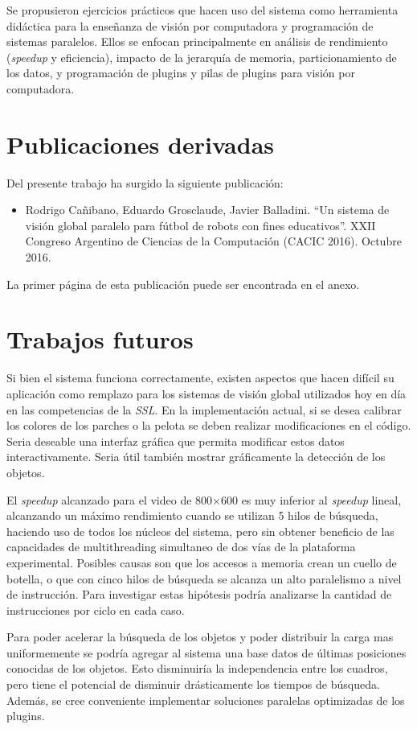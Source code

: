 Se propusieron ejercicios prácticos que hacen uso del sistema como herramienta
didáctica para la enseñanza de visión por computadora y programación de sistemas
paralelos. Ellos se enfocan principalmente en análisis de rendimiento
(\emph{speedup} y eficiencia), impacto de la jerarquía de memoria,
particionamiento de los datos, y programación de plugins y pilas de plugins para
visión por computadora.

\section{Publicaciones derivadas}

\label{publicacionesDerivadas}

Del presente trabajo ha surgido la siguiente publicación:

\begin{itemize}

	\item{Rodrigo Cañibano, Eduardo Grosclaude, Javier Balladini. ``Un
		sistema de visión global paralelo para fútbol de robots con
		fines educativos''. XXII Congreso Argentino de Ciencias de la
		Computación (CACIC 2016). Octubre 2016.}

\end{itemize}

La primer página de esta publicación puede ser encontrada en el anexo.

\section{Trabajos futuros}

\label{trabajosFuturos}

Si bien el sistema funciona correctamente, existen aspectos que hacen difícil su
aplicación como remplazo para los sistemas de visión global utilizados hoy en
día en las competencias de la \emph{SSL}. En la implementación actual, si se
desea calibrar los colores de los parches o la pelota se deben realizar
modificaciones en el código. Seria deseable una interfaz gráfica que permita
modificar estos datos interactivamente. Seria útil también mostrar gráficamente
la detección de los objetos.

El \emph{speedup} alcanzado para el video de 800$\times$600 es muy inferior al
\emph{speedup} lineal, alcanzando un máximo rendimiento cuando se utilizan 5
hilos de búsqueda, haciendo uso de todos los núcleos del sistema, pero sin
obtener beneficio de las capacidades de multithreading simultaneo de dos vías de
la plataforma experimental. Posibles causas son que los accesos a memoria crean
un cuello de botella, o que con cinco hilos de búsqueda se alcanza un alto
paralelismo a nivel de instrucción. Para investigar estas hipótesis podría
analizarse la cantidad de instrucciones por ciclo en cada caso.

Para poder acelerar la búsqueda de los objetos y poder distribuir la carga mas
uniformemente se podría agregar al sistema una base datos de últimas posiciones
conocidas de los objetos. Esto disminuiría la independencia entre los cuadros,
pero tiene el potencial de disminuir drásticamente los tiempos de búsqueda.
Además, se cree conveniente implementar soluciones paralelas optimizadas de los
plugins.

